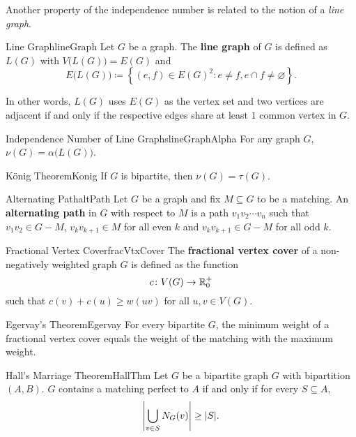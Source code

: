 \documentclass[math, code]{amznotes}
\theoremstyle{remark}
\begin{document}
Another property of the independence number is related to the notion of a \textit{line graph}.
\begin{dfnbox}{Line Graph}{lineGraph}
    Let $G$ be a graph. The {\color{red} \textbf{line graph}} of $G$ is defined as $L(G)$ with $V\bigl(L(G)\bigr) = E(G)$ and
    \begin{equation*}
        E\bigl(L(G)\bigr) \coloneqq \left\{(e, f) \in E(G)^2 \colon e \neq f, e \cap f \neq \varnothing\right\}.
    \end{equation*}
\end{dfnbox}
In other words, $L(G)$ uses $E(G)$ as the vertex set and two vertices are adjacent if and only if the respective edges share at least $1$ common vertex in $G$.
\begin{probox}{Independence Number of Line Graphs}{lineGraphAlpha}
    For any graph $G$, $\nu(G) = \alpha\bigl(L(G)\bigr)$.
\end{probox}
\begin{thmbox}{K\"{o}nig Theorem}{Konig}
    If $G$ is bipartite, then $\nu(G) = \tau(G)$.
\end{thmbox}
\begin{dfnbox}{Alternating Path}{altPath}
    Let $G$ be a graph and fix $M \subseteq G$ to be a matching. An {\color{red} \textbf{alternating path}} in $G$ with respect to $M$ is a path $v_1v_2\cdots v_n$ such that $v_1v_2 \in G - M$, $v_kv_{k + 1} \in M$ for all even $k$ and $v_kv_{k + 1} \in G - M$ for all odd $k$.
\end{dfnbox}
\begin{dfnbox}{Fractional Vertex Cover}{fracVtxCover}
    The {\color{red} \textbf{fractional vertex cover}} of a non-negatively weighted graph $G$ is defined as the function
    \begin{equation*}
        c \colon V(G) \to \mathbb{R}^+_0
    \end{equation*}
    such that $c(v) + c(u) \geq w(uv)$ for all $u, v \in V(G)$.
\end{dfnbox}
\begin{thmbox}{Egervay's Theorem}{Egervay}
    For every bipartite $G$, the minimum weight of a fractional vertex cover equals the weight of the matching with the maximum weight.
\end{thmbox}
\begin{thmbox}{Hall's Marriage Theorem}{HallThm}
    Let $G$ be a bipartite graph $G$ with bipartition $(A, B)$. $G$ contains a matching perfect to $A$ if and only if for every $S \subseteq A$,
    \begin{equation*}
        {\left\lvert {\bigcup_{v \in S}N_G(v)} \right\rvert} \geq {\left\lvert {S} \right\rvert}.
    \end{equation*}
\end{thmbox}
\end{document}
